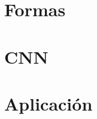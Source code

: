 \documentclass[a4paper,11pt]{book}
\begin{document}


\frontmatter


\tableofcontents

\mainmatter



\part{Formas}


\part{CNN}


\part{Aplicación}




\end{document}
